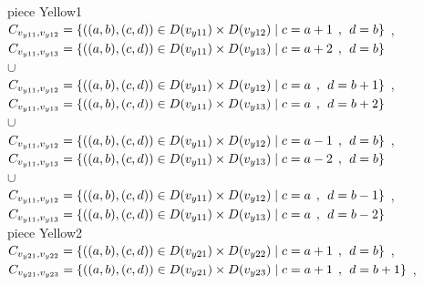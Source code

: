  piece Yellow1
\\$C_{v_{y11},v_{y12}}=\{((a,b),(c,d))\in D(v_{y11})\times D(v_{y12})\mid c = a + 1\hspace{1ex} , \hspace{1ex}  d = b    \}$ , 
\\$C_{v_{y11},v_{y13}}=\{((a,b),(c,d))\in D(v_{y11})\times D(v_{y13})\mid c = a + 2\hspace{1ex} , \hspace{1ex}  d = b    \}$  
\\$\cup$
\\$C_{v_{y11},v_{y12}}=\{((a,b),(c,d))\in D(v_{y11})\times D(v_{y12})\mid c = a  \hspace{1ex} , \hspace{1ex}  d = b + 1 \}$ , 
\\$C_{v_{y11},v_{y13}}=\{((a,b),(c,d))\in D(v_{y11})\times D(v_{y13})\mid c = a  \hspace{1ex} , \hspace{1ex}  d = b + 2 \}$  
\\$\cup$
\\$C_{v_{y11},v_{y12}}=\{((a,b),(c,d))\in D(v_{y11})\times D(v_{y12})\mid c = a - 1\hspace{1ex} , \hspace{1ex}  d = b   \}$ , 
\\$C_{v_{y11},v_{y13}}=\{((a,b),(c,d))\in D(v_{y11})\times D(v_{y13})\mid c = a - 2\hspace{1ex} , \hspace{1ex}  d = b   \}$  
\\$\cup$
\\$C_{v_{y11},v_{y12}}=\{((a,b),(c,d))\in D(v_{y11})\times D(v_{y12})\mid c = a   \hspace{1ex} , \hspace{1ex}  d = b - 1 \}$ , 
\\$C_{v_{y11},v_{y13}}=\{((a,b),(c,d))\in D(v_{y11})\times D(v_{y13})\mid c = a   \hspace{1ex} , \hspace{1ex}  d = b - 2 \}$  
\\ piece Yellow2
\\$C_{v_{y21},v_{y22}}=\{((a,b),(c,d))\in D(v_{y21}) \times D(v_{y22}) \mid c = a + 1\hspace{1ex} , \hspace{1ex}  d = b    \}$ , 
\\$C_{v_{y21},v_{y23}}=\{((a,b),(c,d))\in D(v_{y21}) \times D(v_{y23})\mid c = a + 1\hspace{1ex} , \hspace{1ex}  d = b + 1 \}$ , 
